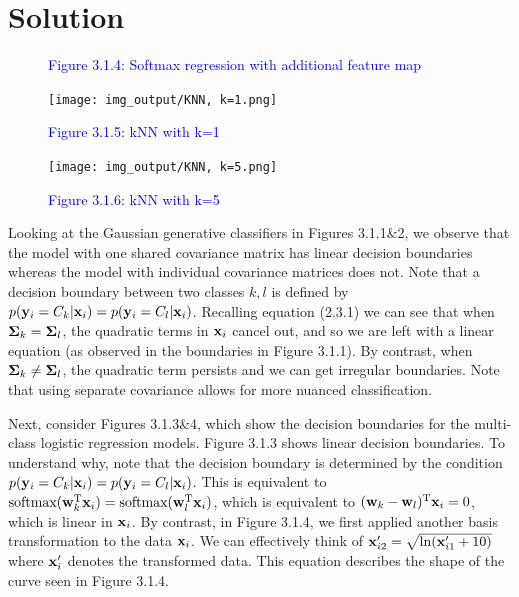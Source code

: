 \documentclass[submit]{../harvardml}
\newenvironment{solution}
  {\color{blue}\section*{Solution}}
{}
\begin{document}
\begin{solution}
\begin{enumerate}
\begin{figure}[H]
        \caption*{\textcolor{blue}{Figure 3.1.4: Softmax regression with additional feature map}}
        \label{fig:q3.1d}
    \end{figure}
    \begin{figure}[H]
        \centering
        \texttt{[image: img\_output/KNN, k=1.png]}
        \caption*{\textcolor{blue}{Figure 3.1.5: kNN with k=1}}
        \label{fig:q3.1e}
    \end{figure}
    \begin{figure}[H]
        \centering
        \texttt{[image: img\_output/KNN, k=5.png]}
        \caption*{\textcolor{blue}{Figure 3.1.6: kNN with k=5}}
        \label{fig:q3.1f}
    \end{figure}

    \clearpage
    Looking at the Gaussian generative classifiers in Figures 3.1.1\&2, we observe that the model with one shared covariance matrix has linear decision boundaries whereas the model with individual covariance matrices does not. Note that a decision boundary between two classes $k,l$ is defined by $p(\mathbf{y}_i = C_k | \mathbf{x}_i) = p(\mathbf{y}_i = C_l | \mathbf{x}_i)$. Recalling equation (2.3.1) we can see that when $\mathbf{\Sigma}_k = \mathbf{\Sigma}_l$, the quadratic terms in $\mathbf{x}_i$ cancel out, and so we are left with a linear equation (as observed in the boundaries in Figure 3.1.1). By contrast, when $\mathbf{\Sigma}_k \neq \mathbf{\Sigma}_l$, the quadratic term persists and we can get irregular boundaries. Note that using separate covariance allows for more nuanced classification.

    \vspace{.5em}
    Next, consider Figures 3.1.3\&4, which show the decision boundaries for the multi-class logistic regression models. Figure 3.1.3 shows linear decision boundaries. To understand why, note that the decision boundary is determined by the condition $p(\mathbf{y}_i = C_k | \mathbf{x}_i) = p(\mathbf{y}_i = C_l | \mathbf{x}_i)$. This is equivalent to $\text{softmax}(\mathbf{w}_k^\mathrm{T}\mathbf{x}_i) = \text{softmax}(\mathbf{w}_l^\mathrm{T}\mathbf{x}_i)$, which is equivalent to $(\mathbf{w}_k - \mathbf{w}_l)^\mathrm{T}\mathbf{x}_i = 0$, which is linear in $\mathbf{x}_i$. By contrast, in Figure 3.1.4, we first applied another basis transformation to the data $\mathbf{x}_i$. We can effectively think of $\mathbf{x}_{i2}^\prime = \sqrt{\ln (\mathbf{x}_{i1}^\prime + 10)}$ where $\mathbf{x}_i^\prime$ denotes the transformed data. This equation describes the shape of the curve seen in Figure 3.1.4.


\end{enumerate}
\end{solution}
\end{document}

